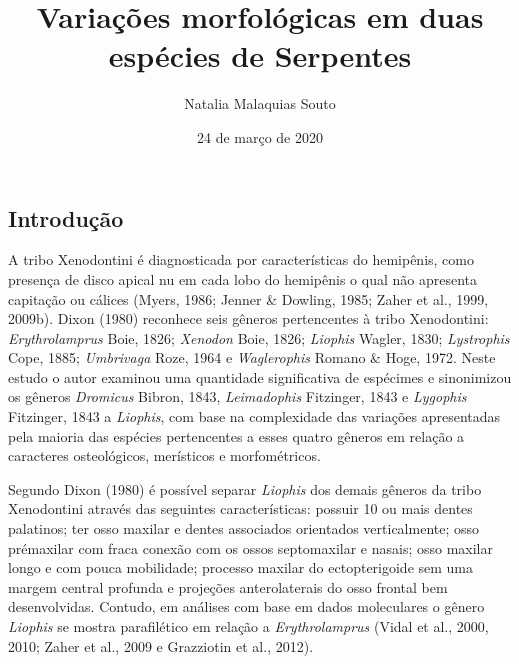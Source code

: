\documentclass[
]{article}
\title{Variações morfológicas em duas espécies de Serpentes}
\author{Natalia Malaquias Souto}
\date{24 de março de 2020}
\begin{document}
\maketitle

\hypertarget{introduuxe7uxe3o}{%
\subsection{Introdução}\label{introduuxe7uxe3o}}

A tribo Xenodontini é diagnosticada por características do hemipênis,
como presença de disco apical nu em cada lobo do hemipênis o qual não
apresenta capitação ou cálices (Myers, 1986; Jenner \& Dowling, 1985;
Zaher et al., 1999, 2009b). Dixon (1980) reconhece seis gêneros
pertencentes à tribo Xenodontini: \emph{Erythrolamprus} Boie, 1826;
\emph{Xenodon} Boie, 1826; \emph{Liophis} Wagler, 1830;
\emph{Lystrophis} Cope, 1885; \emph{Umbrivaga} Roze, 1964 e
\emph{Waglerophis} Romano \& Hoge, 1972. Neste estudo o autor examinou
uma quantidade significativa de espécimes e sinonimizou os gêneros
\emph{Dromicus} Bibron, 1843, \emph{Leimadophis} Fitzinger, 1843 e
\emph{Lygophis} Fitzinger, 1843 a \emph{Liophis}, com base na
complexidade das variações apresentadas pela maioria das espécies
pertencentes a esses quatro gêneros em relação a caracteres
osteológicos, merísticos e morfométricos.

Segundo Dixon (1980) é possível separar \emph{Liophis} dos demais
gêneros da tribo Xenodontini através das seguintes características:
possuir 10 ou mais dentes palatinos; ter osso maxilar e dentes
associados orientados verticalmente; osso prémaxilar com fraca conexão
com os ossos septomaxilar e nasais; osso maxilar longo e com pouca
mobilidade; processo maxilar do ectopterigoide sem uma margem central
profunda e projeções anterolaterais do osso frontal bem desenvolvidas.
Contudo, em análises com base em dados moleculares o gênero
\emph{Liophis} se mostra parafilético em relação a \emph{Erythrolamprus}
(Vidal et al., 2000, 2010; Zaher et al., 2009 e Grazziotin et al.,
2012).
\end{document}

